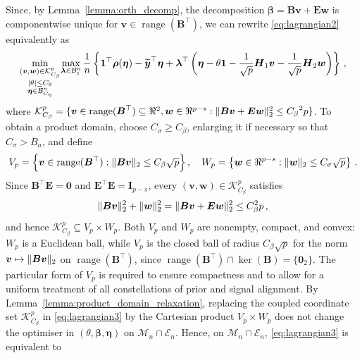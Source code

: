 \documentclass{article}
\makeatletter
\theoremstyle{definition}
\newcommand{\vnorm}[1]{%
	\ensuremath{%
		\if@display
		\left\| #1 \right\|
		\else
		\| #1 \|
		\fi
	}%
}
\newcommand{\abs}[1]{%
	\ensuremath{%
		\if@display
		\left| #1 \right|
		\else
		\lvert #1 \rvert
		\fi
	}%
}
\newcommand*{\bb}{\boldsymbol}
\def\bw {\bb{w}}
\def\bE {\bb{E}}
\def\bv{\bb{v}}
\def\bYtil{\widetilde{\bb{y}}}
\def\bB{\bb{B}}
\def\bbeta{\bb{\beta}}
\def\blambda{\bb{\lambda}}
\newcommand{\range}{\operatorname{range}}
\makeatother
\begin{document}
\begin{bibunit}
Since, by Lemma~\ref{lemma:orth_decomp}, the decomposition $\bbeta = \bB \bv + \bb E \bw$ is componentwise unique for $\bv \in \range(\bb B^\top)$, we can rewrite \eqref{eq:lagrangian2} equivalently as
\begin{equation}
\label{eq:lagrangian3}
    \underset{\substack{(\bv, \bw) \in \mathcal K^p_{C_\beta} \\ \abs{\theta} \leq C_\theta \\ \bb{\eta} \in \mathcal{B}^n_{C_\eta}}}{\min} \underset{\blambda \in \mathcal{B}^n_1}{\max} \,  \frac{1}{n} \left\{\bb{1}^\top \bb{\rho}( \bb{\eta})-  \bYtil^\top\bb{\eta}+ \bb{\lambda}^\top \left(\bb{\eta} - \theta \bb{1} - \frac{1}{\sqrt{p}} \bb{H}_1 \bv - \frac{1}{\sqrt{p}}\bb{H}_2 \bw \right) \right\} \,,
\end{equation}
where $\mathcal{K}_{C_\beta}^p = \{\bv \in \range(\bb B^\top) \subseteq \Re^2, \bw \in \Re^{p-s}: \vnorm{\bB \bv + \bb E \bw}_2^2 \leq {C_\beta}^2 p \}$.
To obtain a product domain, choose $C_\sigma\geq C_\beta$,
enlarging it if necessary so that $C_\sigma>B_a$, and define
\begin{equation}
\label{eq:W_p}
    V_p
    =
    \left\{
        \bv\in\range(\bB^\top):
        \vnorm{\bB\bv}_2\leq C_\beta\sqrt p
    \right\},
    \quad
    W_p
    =
    \left\{
        \bw\in\Re^{p-s}:
        \vnorm{\bw}_2\leq C_\sigma\sqrt p
    \right\} \,.
\end{equation}
Since $\bB^\top\bE=\bb0$ and
$\bE^\top\bE=\bb I_{p-s}$, every
$(\bv,\bw)\in\mathcal K^p_{C_\beta}$ satisfies
$$
    \vnorm{\bB\bv}_2^2+\vnorm{\bw}_2^2
    =
    \vnorm{\bB\bv+\bE\bw}_2^2
    \leq
    C_\beta^2p \,,
$$
and hence
$
    \mathcal K^p_{C_\beta}
    \subseteq
    V_p\times W_p
$.
Both $V_p$ and $W_p$ are nonempty, compact, and convex: $W_p$ is a Euclidean ball, while $V_p$ is the closed ball of radius $C_\beta\sqrt p$ for the norm $\bv\mapsto\vnorm{\bB\bv}_2$ on $\range(\bB^\top)$, since $\range(\bB^\top)\cap\ker(\bB)=\{\bb0_2\}$.
The particular form of $V_p$ is required
to ensure compactness and to allow for a uniform treatment of all
constellations of prior and signal alignment.
By Lemma~\ref{lemma:product_domain_relaxation}, replacing the coupled coordinate set $\mathcal K^p_{C_\beta}$ in
\eqref{eq:lagrangian3} by the Cartesian product $V_p\times W_p$ does not change the optimiser in
$(\theta,\bbeta,\bb{\eta})$ on $\mathcal M_n\cap\mathcal E_n$.
Hence, on $\mathcal M_n \cap \mathcal E_n$,
\eqref{eq:lagrangian3} is equivalent to
\begin{equation}
    \label{eq:lagrangian4}

\end{equation}
\end{bibunit}
\end{document}

